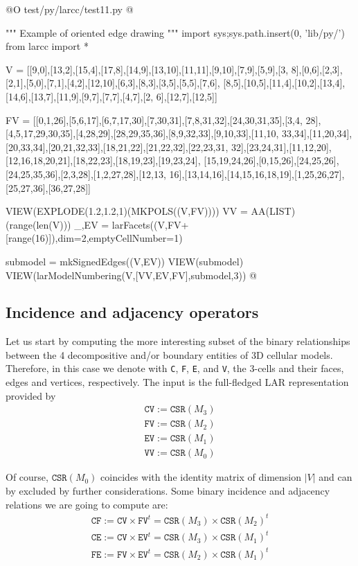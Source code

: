 \documentclass[11pt,oneside]{article}	%
\begin{document}
@O test/py/larcc/test11.py
@{""" Example of oriented edge drawing """
import sys;sys.path.insert(0, 'lib/py/')
from larcc import *

V = [[9,0],[13,2],[15,4],[17,8],[14,9],[13,10],[11,11],[9,10],[7,9],[5,9],[3,
8],[0,6],[2,3],[2,1],[5,0],[7,1],[4,2],[12,10],[6,3],[8,3],[3,5],[5,5],[7,6],
[8,5],[10,5],[11,4],[10,2],[13,4],[14,6],[13,7],[11,9],[9,7],[7,7],[4,7],[2,
6],[12,7],[12,5]]

FV = [[0,1,26],[5,6,17],[6,7,17,30],[7,30,31],[7,8,31,32],[24,30,31,35],[3,4,
28],[4,5,17,29,30,35],[4,28,29],[28,29,35,36],[8,9,32,33],[9,10,33],[11,10,
33,34],[11,20,34],[20,33,34],[20,21,32,33],[18,21,22],[21,22,32],[22,23,31,
32],[23,24,31],[11,12,20],[12,16,18,20,21],[18,22,23],[18,19,23],[19,23,24],
[15,19,24,26],[0,15,26],[24,25,26],[24,25,35,36],[2,3,28],[1,2,27,28],[12,13,
16],[13,14,16],[14,15,16,18,19],[1,25,26,27],[25,27,36],[36,27,28]]

VIEW(EXPLODE(1.2,1.2,1)(MKPOLS((V,FV))))
VV = AA(LIST)(range(len(V)))
_,EV = larFacets((V,FV+[range(16)]),dim=2,emptyCellNumber=1)

submodel = mkSignedEdges((V,EV))
VIEW(submodel)
VIEW(larModelNumbering(V,[VV,EV,FV],submodel,3))
@}



\subsection{Incidence and adjacency operators}

Let us start by computing the more interesting subset of the binary relationships between the 4 decompositive and/or boundary entities of 3D cellular models.  Therefore, in this case we denote with \texttt{C}, \texttt{F}, \texttt{E}, and \texttt{V}, the 3-cells and their faces, edges and vertices, respectively.
The input is the full-fledged LAR representation provided by 
\begin{align}
\texttt{CV} := \texttt{CSR}(M_3) \\
\texttt{FV} := \texttt{CSR}(M_2) \\
\texttt{EV} := \texttt{CSR}(M_1) \\
\texttt{VV} := \texttt{CSR}(M_0) 
\end{align}

Of course, $\texttt{CSR}(M_0)$ coincides with the identity matrix of dimension $|V|$ and can by excluded by further considerations.
Some binary incidence and adjacency relations we are going to compute are:
\begin{align}
\texttt{CF} := \texttt{CV} \times \texttt{FV}^t = \texttt{CSR}(M_3)\times\texttt{CSR}(M_2)^t \\
\texttt{CE} := \texttt{CV} \times \texttt{EV}^t = \texttt{CSR}(M_3)\times\texttt{CSR}(M_1)^t \\
\texttt{FE} := \texttt{FV} \times \texttt{EV}^t = \texttt{CSR}(M_2)\times\texttt{CSR}(M_1)^t 
\end{align}
\end{document}
